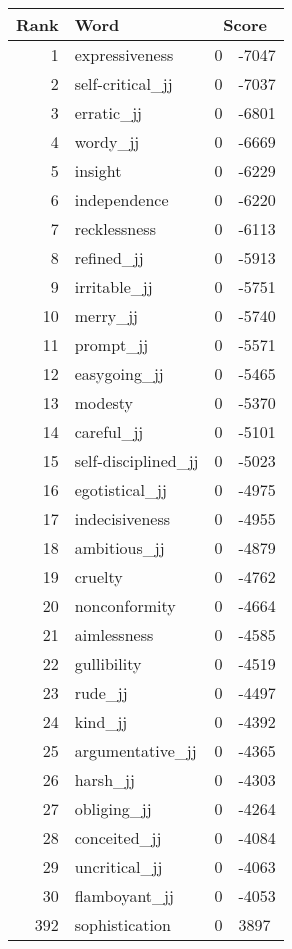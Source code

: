 \begin{longtable}[!htbp]{| rlr@{.}l |}
    \hline
    \textbf{Rank} & \textbf{Word} & \multicolumn{2}{c|}{\textbf{Score}} \\
    \hline
    \endhead
    1 & expressiveness & 0 & -7047 \\
    2 & self-critical\_jj & 0 & -7037 \\
    3 & erratic\_jj & 0 & -6801 \\
    4 & wordy\_jj & 0 & -6669 \\
    5 & insight & 0 & -6229 \\
    6 & independence & 0 & -6220 \\
    7 & recklessness & 0 & -6113 \\
    8 & refined\_jj & 0 & -5913 \\
    9 & irritable\_jj & 0 & -5751 \\
    10 & merry\_jj & 0 & -5740 \\
    11 & prompt\_jj & 0 & -5571 \\
    12 & easygoing\_jj & 0 & -5465 \\
    13 & modesty & 0 & -5370 \\
    14 & careful\_jj & 0 & -5101 \\
    15 & self-disciplined\_jj & 0 & -5023 \\
    16 & egotistical\_jj & 0 & -4975 \\
    17 & indecisiveness & 0 & -4955 \\
    18 & ambitious\_jj & 0 & -4879 \\
    19 & cruelty & 0 & -4762 \\
    20 & nonconformity & 0 & -4664 \\
    21 & aimlessness & 0 & -4585 \\
    22 & gullibility & 0 & -4519 \\
    23 & rude\_jj & 0 & -4497 \\
    24 & kind\_jj & 0 & -4392 \\
    25 & argumentative\_jj & 0 & -4365 \\
    26 & harsh\_jj & 0 & -4303 \\
    27 & obliging\_jj & 0 & -4264 \\
    28 & conceited\_jj & 0 & -4084 \\
    29 & uncritical\_jj & 0 & -4063 \\
    30 & flamboyant\_jj & 0 & -4053 \\
    392 & sophistication & 0 & 3897 \\

\end{longtable}

